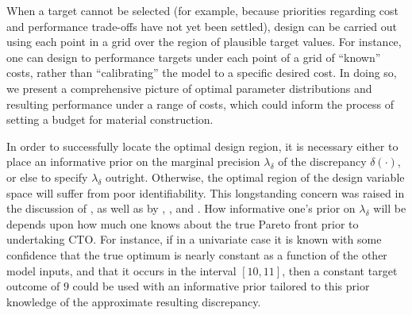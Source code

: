 \documentclass[12pt]{article}
\begin{document}

When a target cannot be selected (for example, because priorities regarding cost and performance trade-offs have not yet been settled), design can be carried out using each point in a grid over the region of plausible target values.
%
For instance, one can design to performance targets under each point of a grid of ``known'' costs, rather than ``calibrating'' the model to a specific desired cost.
%
In doing so, we present a comprehensive picture of optimal parameter distributions and resulting performance under a range of costs, which could inform the process of setting a budget for material construction.

%
In order to successfully locate the optimal design region, it is necessary either to place an informative prior on the marginal precision $\lambda_\delta$ of the discrepancy $\delta(\cdot)$, or else to specify $\lambda_\delta$ outright. 
%
Otherwise, the optimal region of the design variable space will suffer from poor identifiability.
%
This longstanding concern was raised in the discussion of \cite{Kennedy2001}, as well as by \cite{Bayarri2007}, \cite{Tuo2015}, and \cite{Plumlee2017}.
%
How informative one's prior on $\lambda_\delta$ will be depends upon how much one knows about the true Pareto front prior to undertaking CTO.
%
For instance, if in a univariate case it is known with some confidence that the true optimum is nearly constant as a function of the other model inputs, and that it occurs in the interval $[10,11]$, then a constant target outcome of $9$ could be used with an informative prior tailored to this prior knowledge of the approximate resulting discrepancy.
%
\end{document}
